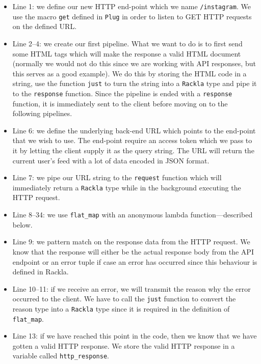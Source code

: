 \documentclass{cslthse-msc}
\begin{document}
\begin{itemize}

\item Line 1: we define our new HTTP end-point which we name \lstinline{/instagram}. We use the macro \lstinline{get} defined in \lstinline{Plug} in order to listen to GET HTTP requests on the defined URL.

\item Line 2--4: we create our first pipeline. What we want to do is to first send some HTML tags which will make the response a valid HTML document (normally we would not do this since we are working with API responses, but this serves as a good example). We do this by storing the HTML code in a string, use the function \lstinline{just} to turn the string into a \lstinline{Rackla} type and pipe it to the \lstinline{response} function. Since the pipeline is ended with a \lstinline{response} function, it is immediately sent to the client before moving on to the following pipelines.

\item Line 6: we define the underlying back-end URL which points to the end-point that we wish to use. The end-point require an access token which we pass to it by letting the client supply it as the query string. The URL will return the current user's feed with a lot of data encoded in JSON format.

\item Line 7: we pipe our URL string to the \lstinline{request} function which will immediately return a \lstinline{Rackla} type while in the background executing the HTTP request.

\item Line 8--34: we use \lstinline{flat_map} with an anonymous lambda function---described below.

\item Line 9: we pattern match on the response data from the HTTP request. We know that the response will either be the actual response body from the API endpoint or an error tuple if case an error has occurred since this behaviour is defined in Rackla.

\item Line 10--11: if we receive an error, we will transmit the reason why the error occurred to the client. We have to call the \lstinline{just} function to convert the reason type into a \lstinline{Rackla} type since it is required in the definition of \lstinline{flat_map}.

\item Line 13: if we have reached this point in the code, then we know that we have gotten a valid HTTP response. We store the valid HTTP response in a variable called \lstinline{http_response}.


\end{itemize}
\end{document}
